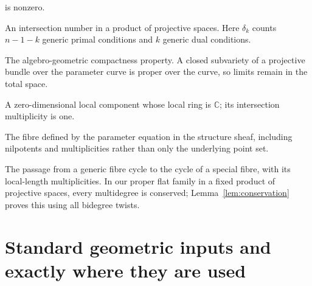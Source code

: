 \documentclass[acmsmall,screen,nonacm]{acmart}
\theoremstyle{definition}
\theoremstyle{remark}
\newcommand{\CC}{\mathbb{C}}
\newcommand{\pdeg}{\delta}
\begin{document}
\begin{description}[style=nextline,leftmargin=3.0cm,labelwidth=2.7cm,itemsep=3pt]
is nonzero.
\item[Multidegree] An intersection number in a product of projective spaces.
Here $\pdeg_k$ counts $n-1-k$ generic primal conditions and $k$ generic dual
conditions.
\item[Properness] The algebro-geometric compactness property.  A closed
subvariety of a projective bundle over the parameter curve is proper over the
curve, so limits remain in the total space.
\item[Reduced isolated point] A zero-dimensional local component whose local
ring is $\CC$; its intersection multiplicity is one.
\item[Scheme-theoretic fibre] The fibre defined by the parameter equation in
the structure sheaf, including nilpotents and multiplicities rather than only
the underlying point set.
\item[Specialization of cycles] The passage from a generic fibre cycle to the
cycle of a special fibre, with its local-length multiplicities.  In our proper
flat family in a fixed product of projective spaces, every multidegree is
conserved; Lemma~\ref{lem:conservation} proves this using all bidegree twists.
\end{description}

\section{Standard geometric inputs and exactly where they are used}
\label{app:inputs}
\end{document}
